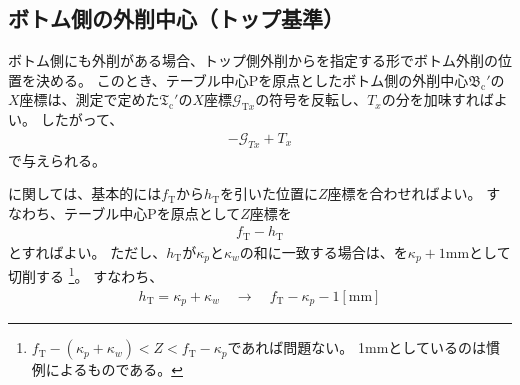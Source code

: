 \subsection{ボトム側の外削中心（トップ基準）}
ボトム側にも外削がある場合、トップ側外削から\CenterlineEndFaceDifAC を指定する形でボトム外削の位置を決める。
このとき、テーブル中心Pを原点としたボトム側の外削中心$\mathfrak B_\mathrm c'$の$X$座標は、測定で定めた$\mathfrak T_\mathrm c'$の$X$座標$\mathcal G_{\mathrm Tx}$の符号を反転し、\CenterlineEndFaceDifAC$T_x$の分を加味すればよい。
したがって、
\begin{align}
  \label{eq:TbasedTx}
  -\mathcal G_{Tx}+T_x
\end{align}
で与えられる。



\clearpage
\modHeadsection{\TopOutcutLength}
\TopOutcutLength に関しては、基本的には\AlocationLength$f_\mathrm T$から\TopOutcutLength$h_\mathrm T$を引いた位置に$Z$座標を合わせればよい。
すなわち、テーブル中心Pを原点として$Z$座標を
\begin{align*}
  f_\mathrm T - h_\mathrm T
\end{align*}
とすればよい。
ただし、\TopOutcutLength$h_\mathrm T$が\KeywayPos$\kappa_p$と\KeywayWidth$\kappa_w$の和に一致する場合は、\TopOutcutLength を$\kappa_p+1$mmとして切削する
\footnote{$f_\mathrm T-(\kappa_p+\kappa_w) < Z < f_\mathrm T-\kappa_p$であれば問題ない。
1mmとしているのは慣例によるものである。}。
すなわち、
\begin{align*}
  h_\mathrm T = \kappa_p+\kappa_w \quad \longrightarrow \quad f_\mathrm T-\kappa_p-1[\mathrm{mm}]
\end{align*}



